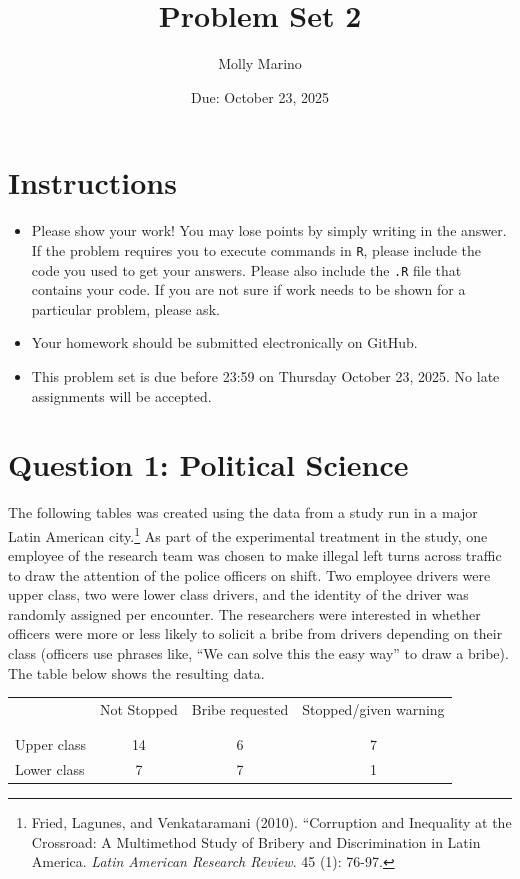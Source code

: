 \documentclass[12pt,letterpaper]{article}
\title{Problem Set 2}
\date{Due: October 23, 2025}
\author{Molly Marino}
\begin{document}
	\maketitle
	\section*{Instructions}
\begin{itemize}
	\item Please show your work! You may lose points by simply writing in the answer. If the problem requires you to execute commands in \texttt{R}, please include the code you used to get your answers. Please also include the \texttt{.R} file that contains your code. If you are not sure if work needs to be shown for a particular problem, please ask.
	\item Your homework should be submitted electronically on GitHub.
	\item This problem set is due before 23:59 on Thursday October 23, 2025. No late assignments will be accepted.

\end{itemize}

	
	\vspace{.5cm}
	\section*{Question 1: Political Science}
		\vspace{.25cm}
	The following tables was created using the data from a study run in a major Latin American city.\footnote{Fried, Lagunes, and Venkataramani (2010). ``Corruption and Inequality at the Crossroad: A Multimethod Study of Bribery and Discrimination in Latin America. \textit{Latin American Research Review}. 45 (1): 76-97.} As part of the experimental treatment in the study, one employee of the research team was chosen to make illegal left turns across traffic to draw the attention of the police officers on shift. Two employee drivers were upper class, two were lower class drivers, and the identity of the driver was randomly assigned per encounter. The researchers were interested in whether officers were more or less likely to solicit a bribe from drivers depending on their class (officers use phrases like, ``We can solve this the easy way'' to draw a bribe). The table below shows the resulting data.

\newpage
\begin{table}[h!]
	\centering
	\begin{tabular}{l | c c c }
		& Not Stopped & Bribe requested & Stopped/given warning \\
		\\[-1.8ex] 
		\hline \\[-1.8ex]
		Upper class & 14 & 6 & 7 \\
		Lower class & 7 & 7 & 1 \\
		\hline
	\end{tabular}
\end{table}
\end{document}
